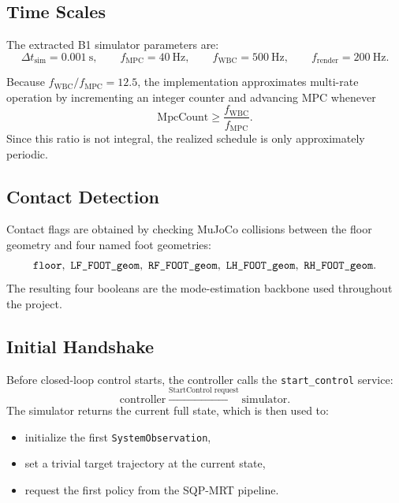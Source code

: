 \documentclass[11pt,a4paper]{article}
\newcommand{\code}[1]{\texttt{#1}}
\begin{document}
\subsection{Time Scales}
The extracted B1 simulator parameters are:
\begin{equation}
\Delta t_{\mathrm{sim}} = 0.001~\mathrm{s},\qquad
f_{\mathrm{MPC}} = 40~\mathrm{Hz},\qquad
f_{\mathrm{WBC}} = 500~\mathrm{Hz},\qquad
f_{\mathrm{render}} = 200~\mathrm{Hz}.
\end{equation}

Because \(f_{\mathrm{WBC}} / f_{\mathrm{MPC}} = 12.5\), the implementation approximates multi-rate operation by incrementing an integer counter and advancing MPC whenever
\begin{equation}
\text{MpcCount} \ge \frac{f_{\mathrm{WBC}}}{f_{\mathrm{MPC}}}.
\end{equation}
Since this ratio is not integral, the realized schedule is only approximately periodic.

\subsection{Contact Detection}
Contact flags are obtained by checking MuJoCo collisions between the floor geometry and four named foot geometries:
\begin{equation}
\text{\texttt{floor}},\ \text{\texttt{LF\_FOOT\_geom}},\ \text{\texttt{RF\_FOOT\_geom}},\ \text{\texttt{LH\_FOOT\_geom}},\ \text{\texttt{RH\_FOOT\_geom}}.
\end{equation}
The resulting four booleans are the mode-estimation backbone used throughout the project.

\subsection{Initial Handshake}
Before closed-loop control starts, the controller calls the \code{start\_control} service:
\begin{equation}
\text{controller} \xrightarrow{\text{StartControl request}} \text{simulator}.
\end{equation}
The simulator returns the current full state, which is then used to:
\begin{itemize}[leftmargin=*]
\item initialize the first \code{SystemObservation},
\item set a trivial target trajectory at the current state,
\item request the first policy from the SQP-MRT pipeline.
\end{itemize}
\end{document}
